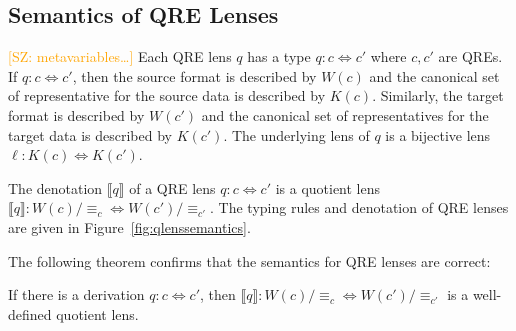 \documentclass{svproc}
\newcommand{\FINISH}[3]{\ifdraft\textcolor{#1}{[#2: #3]}\fi}
\newcommand{\saz}[1]{\FINISH{orange}{SZ}{#1}}
\newcommand{\eqrel}[1]{\ensuremath{\equiv_{#1}}}
\begin{document}

\subsection{Semantics of QRE Lenses}

\saz{metavariables\ldots}
Each QRE lens $q$ has a type $q : c \Leftrightarrow c'$ where $c, c'$ are QREs.
If $q : c \Leftrightarrow c'$, then the source format is described by $W(c)$ and
the canonical set of representative for the source data is described by $K(c)$.
Similarly, the target format is described by $W(c')$ and the canonical set of
representatives for the target data is described by $K(c')$. The underlying lens
of $q$ is a bijective lens $\ell : K(c) \Leftrightarrow K(c')$.

The denotation $\llbracket q \rrbracket$ of a QRE lens $q:c \Leftrightarrow c'$
is a quotient lens $\llbracket q \rrbracket : W(c)/{\eqrel{c}}
\Longleftrightarrow W(c')/{\eqrel{c'}}$. The typing rules and denotation of QRE
lenses are given in Figure~\ref{fig:qlenssemantics}.

The following theorem confirms that the semantics for QRE lenses are correct:
\begin{theorem}
If there is a derivation $q : c \Leftrightarrow c'$, then $\llbracket q
\rrbracket : W(c)/{\eqrel{c}} \Leftrightarrow W(c')/{\eqrel{c'}}$ is a
well-defined quotient lens.
\end{theorem}
\end{document}
